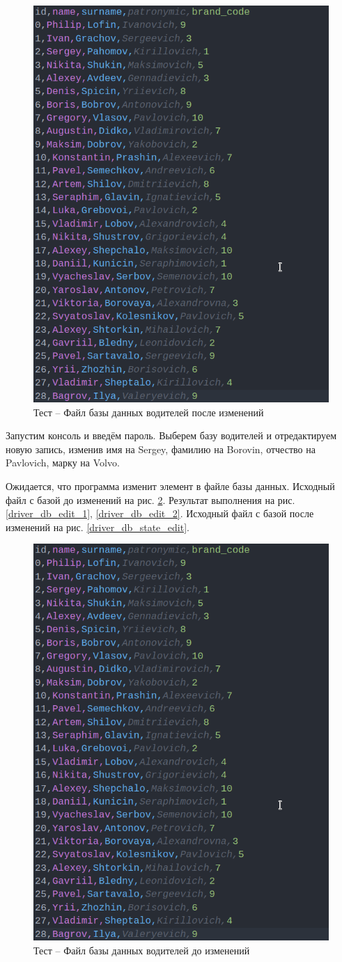 \begin{figure}[H]
	\centering
	\includegraphics[width=0.5\linewidth]{photo/tests/admin/driver_db_state_add}
	\caption{Тест -- Файл базы данных водителей после изменений}
	\label{driver_db_state_add}
\end{figure}

Запустим консоль и введём пароль. 
Выберем базу водителей и отредактируем новую запись,
изменив 
имя на Sergey,
фамилию на Borovin,
отчество на Pavlovich,
марку на Volvo.

Ожидается, что программа изменит элемент в файле базы данных.
Исходный файл с базой до изменений на рис. \ref{driver_db_state_add2}.
Результат выполнения на рис. \ref{driver_db_edit_1}, \ref{driver_db_edit_2}.
Исходный файл с базой после изменений на рис. \ref{driver_db_state_edit}.

\begin{figure}[H]
	\centering
	\includegraphics[width=0.7\linewidth]{photo/tests/admin/driver_db_state_add}
	\caption{Тест -- Файл базы данных водителей до изменений}
	\label{driver_db_state_add2}
\end{figure}

